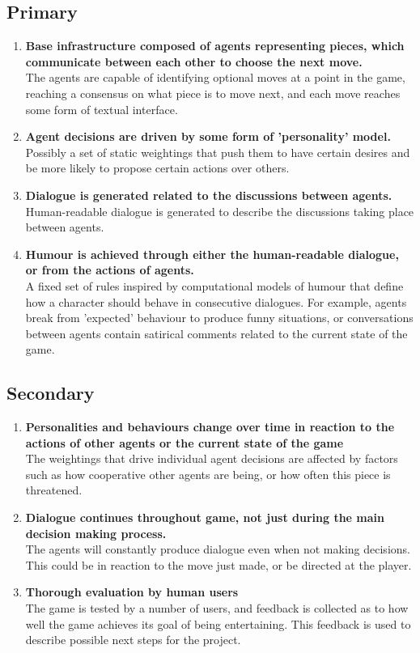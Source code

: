\documentclass[12pt]{extarticle}
\newcommand\descitem[1]{\item{\bfseries #1}\\}
\begin{document}
\subsection*{Primary}
\begin{enumerate}
		\descitem{Base infrastructure composed of agents representing pieces, which communicate between each other to choose the next move.}
		The agents are capable of identifying optional moves at a point in the game, reaching a consensus on what piece is to move next, and each move reaches some form of textual interface.

		\descitem{Agent decisions are driven by some form of 'personality' model.}
		Possibly a set of static weightings that push them to have certain desires and be more likely to propose certain actions over others.

		\descitem{Dialogue is generated related to the discussions between agents.}
		Human-readable dialogue is generated to describe the discussions taking place between agents.

		\descitem{Humour is achieved through either the human-readable dialogue, or from the actions of agents.}
		A fixed set of rules inspired by computational models of humour that define how a character should behave in consecutive dialogues. For example, agents break from 'expected' behaviour to produce funny situations, or conversations between agents contain satirical comments related to the current state of the game.

\end{enumerate}

\subsection*{Secondary}

\begin{enumerate}
		\descitem{Personalities and behaviours change over time in reaction to the actions of other agents or the current state of the game}
		The weightings that drive individual agent decisions are affected by factors such as how cooperative other agents are being, or how often this piece is threatened.

		\descitem{Dialogue continues throughout game, not just during the main decision making process.}
		The agents will constantly produce dialogue even when not making decisions. This could be in reaction to the move just made, or be directed at the player.

		\descitem{Thorough evaluation by human users}
		The game is tested by a number of users, and feedback is collected as to how well the game achieves its goal of being entertaining. This feedback is used to describe possible next steps for the project.

\end{enumerate}
\end{document}
